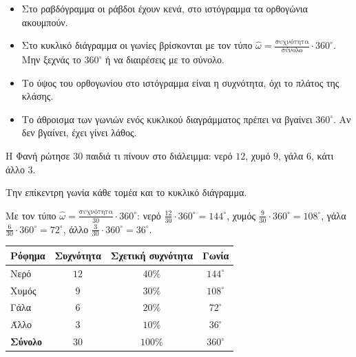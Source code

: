 \begin{prosoxi}
\begin{itemize}[leftmargin=1.2em,itemsep=0.3ex,topsep=2pt]
\item Στο ραβδόγραμμα οι ράβδοι έχουν κενά, στο ιστόγραμμα τα ορθογώνια ακουμπούν.
\item Στο κυκλικό διάγραμμα οι γωνίες βρίσκονται με τον τύπο $\hat{\omega}=\frac{\text{συχνότητα}}{\text{σύνολο}}\cdot360^\circ$. Μην ξεχνάς το $360^\circ$ ή να διαιρέσεις με το σύνολο.
\item Το ύψος του ορθογωνίου στο ιστόγραμμα είναι η συχνότητα, όχι το πλάτος της κλάσης.
\item Το άθροισμα των γωνιών ενός κυκλικού διαγράμματος πρέπει να βγαίνει $360^\circ$. Αν δεν βγαίνει, έχει γίνει λάθος.
\end{itemize}
\end{prosoxi}


\tixero Η Φανή ρώτησε $30$ παιδιά τι πίνουν στο διάλειμμα: νερό $12$, χυμό $9$, γάλα $6$, κάτι άλλο $3$.\par
\tithelo Την επίκεντρη γωνία κάθε τομέα και το κυκλικό διάγραμμα.\par
\possindeo Με τον τύπο $\hat{\omega}=\frac{\text{συχνότητα}}{30}\cdot360^\circ$: νερό $\frac{12}{30}\cdot360^\circ=144^\circ$, χυμός $\frac{9}{30}\cdot360^\circ=108^\circ$, γάλα $\frac{6}{30}\cdot360^\circ=72^\circ$, άλλο $\frac{3}{30}\cdot360^\circ=36^\circ$.\par
\apantisi

\begin{center}
\renewcommand{\arraystretch}{1.25}
\begin{tabular}{lccc}
\toprule
\textbf{Ρόφημα} & \textbf{Συχνότητα} & \textbf{Σχετική συχνότητα} & \textbf{Γωνία}\\
\midrule
Νερό & $12$ & $40\%$ & $144^\circ$\\
Χυμός & $9$ & $30\%$ & $108^\circ$\\
Γάλα & $6$ & $20\%$ & $72^\circ$\\
Άλλο & $3$ & $10\%$ & $36^\circ$\\
\midrule
\textbf{Σύνολο} & $30$ & $100\%$ & $360^\circ$\\
\bottomrule
\end{tabular}
\end{center}

\begin{center}
\end{center}

